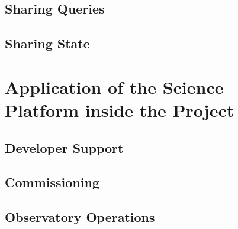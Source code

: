 \documentclass[DM,lsstdraft,toc]{lsstdoc}
\begin{document}
\subsection{Sharing Queries}\label{sharing-queries}

\subsection{Sharing State}\label{sharing-state}

\section{Application of the Science Platform inside the Project}\label{application-of-the-science-platform-inside-the-project}

\subsection{Developer Support}\label{developer-support}

\subsection{Commissioning}\label{commissioning}

\subsection{Observatory Operations}\label{observatory-operations}



\end{document}
